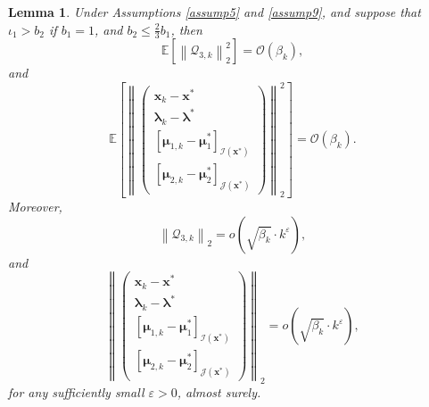 \documentclass[aos]{imsart}
\numberwithin{equation}{section}
\theoremstyle{plain}
\newtheorem{lemma}{Lemma}
\begin{document}
\begin{appendix}
\begin{lemma}
\label{lemma17}
    Under Assumptions \ref{assump5} and  \ref{assump9}, and suppose that $\iota_1>b_2$ if $b_1=1$, and $b_2 \leq \frac{2}{3}b_1$, then
    \begin{equation*}
        \mathbb{E}\left[ \left\| \mathcal{Q}_{3,k} \right\|_2^2 \right] =  \mathcal{O} \left( \beta_k \right),
    \end{equation*}
    and
    \begin{equation*}
    \mathbb{E} \left[ \left\|  \left( \begin{array}{c}
    \bm{x}_{k} - \bm{x}^{*}  \\
    \bm{\lambda}_{k} - \bm{\lambda}^{*} \\
    \left[ \bm{\mu}_{1,k} - \bm{\mu}_{1}^{*}\right]_{\mathcal{I}(\bm{x}^{*})} \\
    \left[ \bm{\mu}_{2,k} - \bm{\mu}_{2}^{*} \right]_{\mathcal{J}(\bm{x}^{*})} 
    \end{array} \right)  \right\|_2^2  \right] = \mathcal{O} \left( \beta_k \right).
    \end{equation*}
    Moreover, 
     \begin{equation*}
        \left\| \mathcal{Q}_{3,k} \right\|_2 = o\left(\sqrt{\beta_k} \cdot k^{\varepsilon}  \right),
    \end{equation*}
    and
    \begin{equation}
    \label{eq30}
        \left\|  \left( \begin{array}{c}
    \bm{x}_{k} - \bm{x}^{*}  \\
    \bm{\lambda}_{k} - \bm{\lambda}^{*} \\
    \left[ \bm{\mu}_{1,k} - \bm{\mu}_{1}^{*}\right]_{\mathcal{I}(\bm{x}^{*})} \\
    \left[ \bm{\mu}_{2,k} - \bm{\mu}_{2}^{*} \right]_{\mathcal{J}(\bm{x}^{*})} 
    \end{array} \right)  \right\|_2  =  o\left(\sqrt{\beta_k} \cdot k^{\varepsilon}  \right),
    \end{equation}
    for any sufficiently small $\varepsilon > 0$, almost surely. 
\end{lemma}



\end{appendix}
\end{document}
